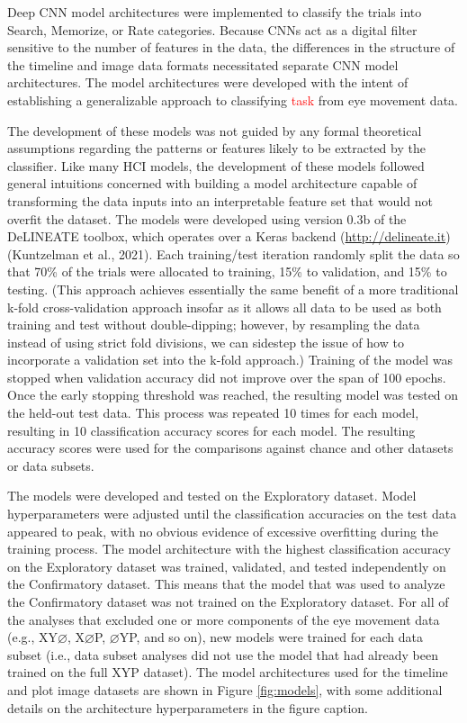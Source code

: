 \documentclass[
  english,
  man, donotrepeattitle,floatsintext]{apa6}
\begin{document}
Deep CNN model architectures were implemented to classify the trials into Search, Memorize, or Rate categories. Because CNNs act as a digital filter sensitive to the number of features in the data, the differences in the structure of the timeline and image data formats necessitated separate CNN model architectures. The model architectures were developed with the intent of establishing a generalizable approach to classifying \textcolor{red}{task} from eye movement data.

The development of these models was not guided by any formal theoretical assumptions regarding the patterns or features likely to be extracted by the classifier. Like many HCI models, the development of these models followed general intuitions concerned with building a model architecture capable of transforming the data inputs into an interpretable feature set that would not overfit the dataset. The models were developed using version 0.3b of the DeLINEATE toolbox, which operates over a Keras backend (\url{http://delineate.it}) (Kuntzelman et al., 2021). Each training/test iteration randomly split the data so that 70\% of the trials were allocated to training, 15\% to validation, and 15\% to testing. (This approach achieves essentially the same benefit of a more traditional k-fold cross-validation approach insofar as it allows all data to be used as both training and test without double-dipping; however, by resampling the data instead of using strict fold divisions, we can sidestep the issue of how to incorporate a validation set into the k-fold approach.) Training of the model was stopped when validation accuracy did not improve over the span of 100 epochs. Once the early stopping threshold was reached, the resulting model was tested on the held-out test data. This process was repeated 10 times for each model, resulting in 10 classification accuracy scores for each model. The resulting accuracy scores were used for the comparisons against chance and other datasets or data subsets.

The models were developed and tested on the Exploratory dataset. Model hyperparameters were adjusted until the classification accuracies on the test data appeared to peak, with no obvious evidence of excessive overfitting during the training process. The model architecture with the highest classification accuracy on the Exploratory dataset was trained, validated, and tested independently on the Confirmatory dataset. This means that the model that was used to analyze the Confirmatory dataset was not trained on the Exploratory dataset. For all of the analyses that excluded one or more components of the eye movement data (e.g., XY\(\varnothing\), X\(\varnothing\)P, \(\varnothing\)YP, and so on), new models were trained for each data subset (i.e., data subset analyses did not use the model that had already been trained on the full XYP dataset). The model architectures used for the timeline and plot image datasets are shown in Figure \ref{fig:models}, with some additional details on the architecture hyperparameters in the figure caption.
\end{document}
